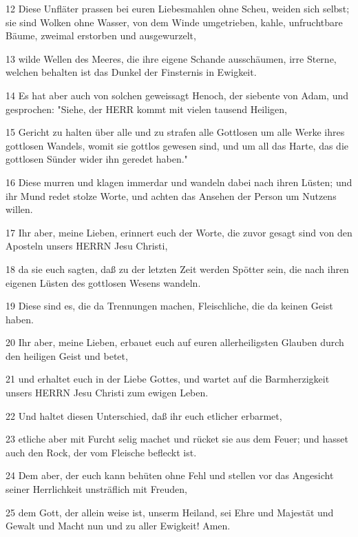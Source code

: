 \par 12 Diese Unfläter prassen bei euren Liebesmahlen ohne Scheu, weiden sich selbst; sie sind Wolken ohne Wasser, von dem Winde umgetrieben, kahle, unfruchtbare Bäume, zweimal erstorben und ausgewurzelt,
\par 13 wilde Wellen des Meeres, die ihre eigene Schande ausschäumen, irre Sterne, welchen behalten ist das Dunkel der Finsternis in Ewigkeit.
\par 14 Es hat aber auch von solchen geweissagt Henoch, der siebente von Adam, und gesprochen: "Siehe, der HERR kommt mit vielen tausend Heiligen,
\par 15 Gericht zu halten über alle und zu strafen alle Gottlosen um alle Werke ihres gottlosen Wandels, womit sie gottlos gewesen sind, und um all das Harte, das die gottlosen Sünder wider ihn geredet haben."
\par 16 Diese murren und klagen immerdar und wandeln dabei nach ihren Lüsten; und ihr Mund redet stolze Worte, und achten das Ansehen der Person um Nutzens willen.
\par 17 Ihr aber, meine Lieben, erinnert euch der Worte, die zuvor gesagt sind von den Aposteln unsers HERRN Jesu Christi,
\par 18 da sie euch sagten, daß zu der letzten Zeit werden Spötter sein, die nach ihren eigenen Lüsten des gottlosen Wesens wandeln.
\par 19 Diese sind es, die da Trennungen machen, Fleischliche, die da keinen Geist haben.
\par 20 Ihr aber, meine Lieben, erbauet euch auf euren allerheiligsten Glauben durch den heiligen Geist und betet,
\par 21 und erhaltet euch in der Liebe Gottes, und wartet auf die Barmherzigkeit unsers HERRN Jesu Christi zum ewigen Leben.
\par 22 Und haltet diesen Unterschied, daß ihr euch etlicher erbarmet,
\par 23 etliche aber mit Furcht selig machet und rücket sie aus dem Feuer; und hasset auch den Rock, der vom Fleische befleckt ist.
\par 24 Dem aber, der euch kann behüten ohne Fehl und stellen vor das Angesicht seiner Herrlichkeit unsträflich mit Freuden,
\par 25 dem Gott, der allein weise ist, unserm Heiland, sei Ehre und Majestät und Gewalt und Macht nun und zu aller Ewigkeit! Amen.


